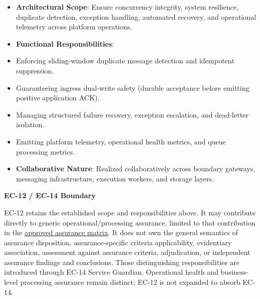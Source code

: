 \begin{itemize}


\item \textbf{Architectural Scope}: Ensure concurrency integrity, system resilience, duplicate detection, exception handling, automated recovery, and operational telemetry across platform operations.

\item \textbf{Functional Responsibilities}:

\item Enforcing sliding-window duplicate message detection and idempotent suppression.

\item Guaranteeing ingress dual-write safety (durable acceptance before emitting positive application ACK).

\item Managing structured failure recovery, exception escalation, and dead-letter isolation.

\item Emitting platform telemetry, operational health metrics, and queue processing metrics.

\item \textbf{Collaborative Nature}: Realized collaboratively across boundary gateways, messaging infrastructure, execution workers, and storage layers.

\end{itemize}


\par\medskip\textbf{EC-12 / EC-14 Boundary}\par


EC-12 retains the established scope and responsibilities above. It may contribute directly to generic operational/processing assurance, limited to that contribution in the \href{\detokenize{../../../../../docs/markdown/02-strategy/capability-maps/health-service-assurance-derivation.md#collaborative-enterprise-capability-contribution-matrix}}{approved assurance matrix}. It does not own the general semantics of assurance disposition, assurance-specific criteria applicability, evidentiary association, assessment against assurance criteria, adjudication, or independent assurance findings and conclusions. Those distinguishing responsibilities are introduced through EC-14 Service Guardian. Operational health and business-level processing assurance remain distinct; EC-12 is not expanded to absorb EC-14.



